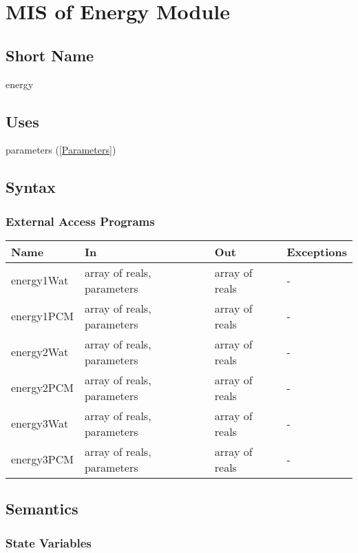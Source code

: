\documentclass[12pt]{article}
\begin{document}
\section{MIS of Energy Module} \label{Energy}

\subsection{Short Name}

energy

\subsection{Uses}

parameters (\ref{Parameters})

\subsection{Syntax}

\subsubsection{External Access Programs}

\begin{center}
\begin{tabular}{p{3cm} p{6cm} p{3cm} p{2cm}}
\hline
\textbf{Name} & \textbf{In} & \textbf{Out} & \textbf{Exceptions} \\
\hline
energy1Wat & array of reals, parameters & array of reals & - \\
\hline
energy1PCM & array of reals, parameters & array of reals & - \\
\hline
energy2Wat & array of reals, parameters & array of reals & - \\
\hline
energy2PCM & array of reals, parameters & array of reals & - \\
\hline
energy3Wat & array of reals, parameters & array of reals & - \\
\hline
energy3PCM & array of reals, parameters & array of reals & - \\
\hline
\end{tabular}
\end{center}

\subsection{Semantics}

\subsubsection{State Variables}
\end{document}

